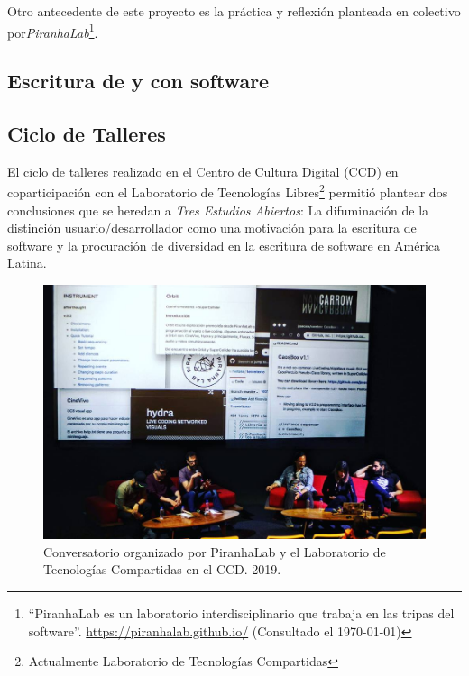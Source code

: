Otro antecedente de este proyecto es la práctica y reflexión planteada en colectivo por\textit{PiranhaLab}\footnote{``PiranhaLab es un laboratorio interdisciplinario que trabaja en las tripas del software''. \url{https://piranhalab.github.io/} (Consultado el \today)}.

\subsection{Escritura de y con software}

\subsection{Ciclo de Talleres}

El ciclo de talleres realizado en el Centro de Cultura Digital (CCD) en coparticipación con el Laboratorio de Tecnologías Libres\footnote{Actualmente Laboratorio de Tecnologías Compartidas} permitió plantear dos conclusiones que se heredan a \textit{Tres Estudios Abiertos}: La difuminación de la distinción usuario/desarrollador como una motivación para la escritura de software y la procuración de diversidad en la escritura de software en América Latina.

\begin{figure}[tb]
\centering 
\includegraphics[width=\columnwidth]{../../img/conversatorio.jpg} 
\caption[Conversatorio CCD]{Conversatorio organizado por PiranhaLab y el Laboratorio de Tecnologías Compartidas en el CCD. 2019.} %
\label{fig:gallery} 
\end{figure}


